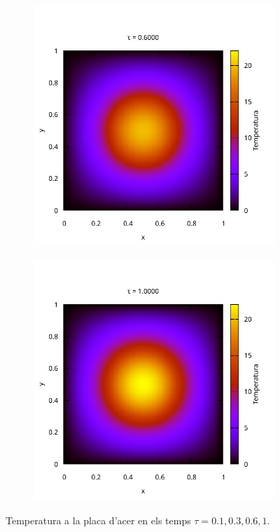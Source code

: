 \documentclass[10pt,a4paper]{article}
\theoremstyle{definition}
\theoremstyle{remark}
\begin{document}
\begin{figure}[ht]
\begin{subfigure}{0.49\linewidth}
  \end{subfigure}\\\vspace{-1cm}
  \begin{subfigure}{0.49\linewidth}
    \centering
    \includegraphics[width=\textwidth]{../plot/Images/heatmap_00060.pdf}
  \end{subfigure}\hfill
  \begin{subfigure}{0.49\linewidth}
    \centering
    \includegraphics[width=\textwidth]{../plot/Images/heatmap_00100.pdf}
  \end{subfigure}
  \caption{Temperatura a la placa d'acer en els temps $\tau=0.1,0.3,0.6,1$.}
\end{figure}
\end{document}
